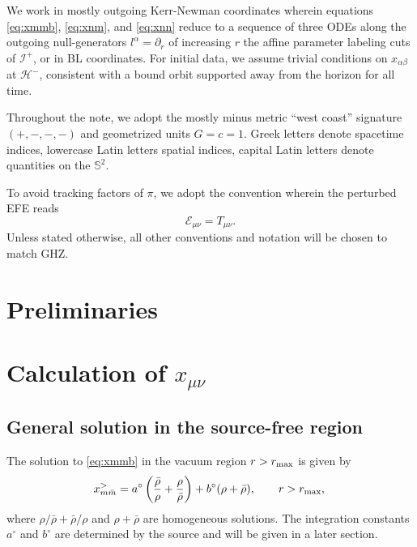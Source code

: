 \documentclass[preprint,aps,nofootinbib,a4paper,superscriptaddress,longbibliography,amsfonts, amssymb,amsmath,titlepage]{revtex4-1}
\numberwithin{equation}{section} %
\def\rhb{\bar\rho}
\def\mb{\bar m}
\def\pd{\partial}
\def\pd{\partial}
\def\beq{\begin{equation}}
\def\eeq{\end{equation}}
\def\beq{\begin{equation}}
\def\eeq{\end{equation}}
\def\a{\alpha}
\def\b{\beta}
\begin{document}
We work in mostly outgoing Kerr-Newman coordinates wherein equations \eqref{eq:xmmb}, \eqref{eq:xnm}, and \eqref{eq:xnn} reduce to a sequence of three ODEs along the outgoing null-generators $l^{\a} = \pd_{r}$ of increasing $r$ the affine parameter labeling cuts of $\mathcal I^{+}$, or in BL coordinates.  For initial data, we assume trivial conditions on $x_{\a\b}$ at $\mathcal{H}^-$, consistent with a bound orbit supported away from the horizon for all time.	

Throughout the note, we adopt the mostly minus metric ``west coast'' signature $(+,-,-,-)$ and geometrized units $G=c=1$. Greek letters denote spacetime  indices, lowercase Latin letters spatial indices, capital Latin letters denote quantities on the $\mathbb S^2$.

To avoid tracking factors of $\pi$, we  adopt the convention wherein the perturbed EFE reads
\begin{equation}
\mathcal{E}_{\mu\nu} = T_{\mu\nu}.
\end{equation}
Unless stated otherwise, all other conventions and notation will be chosen to match GHZ.

\section{Preliminaries}\label{sec:prelims}



\section{Calculation of $x_{\mu\nu}$}\label{sec:main calc}

\subsection{General solution in the source-free region}
The solution to \eqref{eq:xmmb} in the vacuum region  $r>r_{\rm max}$ is given by
\beq
x^>_{m\mb} = a^\circ \left( \frac{\rhb}{\rho}+\frac{\rho}{\rhb} \right) + b^\circ (\rho+\rhb), \qquad r>r_{\rm max}, \\
\eeq
where $\rho/\rhb+\rhb/\rho$ and $\rho+\rhb$  are homogeneous solutions. The integration constants $a^\circ$ and $b^\circ$ are determined by the source and will be given in a later section.
\end{document}
